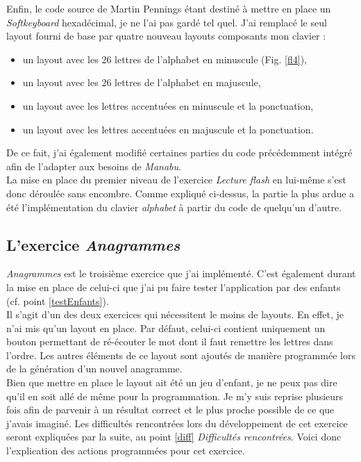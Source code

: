 Enfin, le code source de Martin Pennings étant destiné à mettre en place un \textit{Softkeyboard} hexadécimal, je ne l'ai pas gardé tel quel. J'ai remplacé le seul layout fourni de base par quatre nouveau layouts composants mon clavier :
\begin{itemize}
\item un layout avec les 26 lettres de l'alphabet en minuscule (Fig. \ref{fl4}),
\item un layout avec les 26 lettres de l'alphabet en majuscule,
\item un layout avec les lettres accentuées en minuscule et la ponctuation,
\item un layout avec les lettres accentuées en majuscule et la ponctuation.
\end{itemize}
De ce fait, j'ai également modifié certaines parties du code précédemment intégré afin de l'adapter aux besoins de \textit{Manabu}.\\

La mise en place du premier niveau de l'exercice \textit{Lecture flash} en lui-même s'est donc déroulée sans encombre. Comme expliqué ci-dessus, la partie la plus ardue a été l'implémentation du clavier \textit{alphabet} à partir du code de quelqu'un d'autre.
	
\subsection{L'exercice \textit{Anagrammes}}
\textit{Anagrammes} est le troisième exercice que j'ai implémenté. C'est également durant la mise en place de celui-ci que j'ai pu faire tester l'application par des enfants (cf. point \ref{testEnfants}).\\

Il s'agit d'un des deux exercices qui nécessitent le moins de layouts. En effet, je n'ai mis qu'un layout en place. Par défaut, celui-ci contient uniquement un bouton permettant de ré-écouter le mot dont il faut remettre les lettres dans l'ordre. Les autres éléments de ce layout sont ajoutés de manière programmée lors de la génération d'un nouvel anagramme.\\

Bien que mettre en place le layout ait été un jeu d'enfant, je ne peux pas dire qu'il en soit allé de même pour la programmation. Je m'y suis reprise plusieurs fois afin de parvenir à un résultat correct et le plus proche possible de ce que j'avais imaginé. Les difficultés rencontrées lors du développement de cet exercice seront expliquées par la suite, au point \ref{diff} \textit{Difficultés rencontrées}. Voici donc l'explication des actions programmées pour cet exercice.\\

